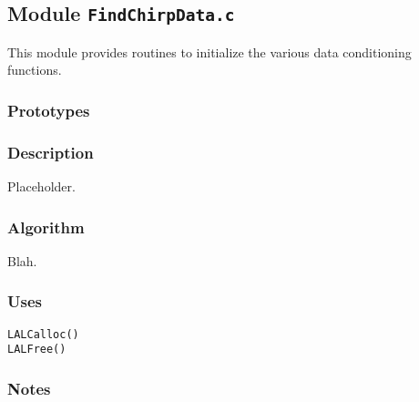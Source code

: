 \subsection{Module \texttt{FindChirpData.c}}
\label{ss:FindChirpData.c}

This module provides routines to initialize the various data conditioning 
functions.

\subsubsection*{Prototypes}
\vspace{0.1in}


\subsubsection*{Description}

Placeholder.

\subsubsection*{Algorithm}

Blah.

\subsubsection*{Uses}
\begin{verbatim}
LALCalloc()
LALFree()
\end{verbatim}

\subsubsection*{Notes}
